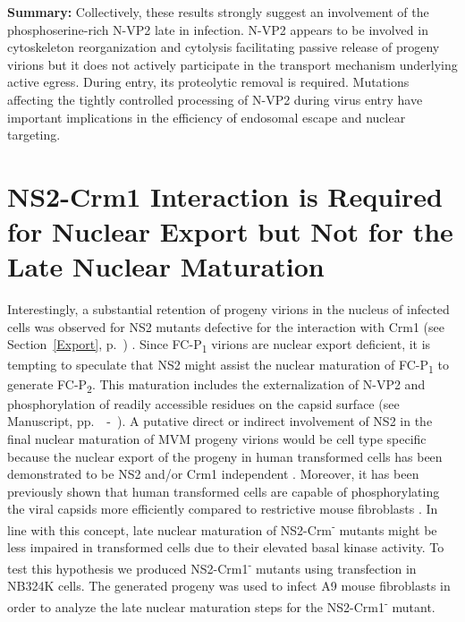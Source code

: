 \medskip
\textbf{Summary:} Collectively, these results strongly suggest an involvement of the phosphoserine-rich N-VP2 late in infection. N-VP2 appears to be involved in cytoskeleton reorganization and cytolysis facilitating passive release of progeny virions but it does not actively participate in the transport mechanism underlying active egress. During entry, its proteolytic removal is required. Mutations affecting the tightly controlled processing of N-VP2 during virus entry have important implications in the efficiency of endosomal escape and nuclear targeting.         


\clearpage
\section{NS2-Crm1 Interaction is Required for Nuclear Export but Not for the Late Nuclear Maturation}

Interestingly, a substantial retention of progeny virions in the nucleus of infected cells was observed for NS2 mutants defective for the interaction with Crm1 (see Section~\ref{Export}, p.~\pageref{Export}) \cite{pmid12239307, pmid11884550}. Since FC-P\textsubscript{1} virions are nuclear export deficient, it is tempting to speculate that NS2 might assist the nuclear maturation of FC-P\textsubscript{1} to generate FC-P\textsubscript{2}. This maturation includes the externalization of N-VP2 and phosphorylation of readily accessible residues on the capsid surface (see Manuscript, pp.~\pageref{ChapterPub1}~-~\pageref{ChapterPub1End}). A putative direct or indirect involvement of NS2 in the final nuclear maturation of MVM progeny virions would be cell type specific because the nuclear export of the progeny in human transformed cells has been demonstrated to be NS2 and/or Crm1 independent \cite{pmid2147041, pmid15367635}. Moreover, it has been previously shown that human transformed cells are capable of phosphorylating the viral capsids more efficiently compared to restrictive mouse fibroblasts \cite{pmid11069983}. In line with this concept, late nuclear maturation of NS2-Crm\textsuperscript{-} mutants might be less impaired in transformed cells due to their elevated basal kinase activity. To test this hypothesis we produced NS2-Crm1\textsuperscript{-} mutants using transfection in NB324K cells. The generated progeny was used to infect A9 mouse fibroblasts in order to analyze the late nuclear maturation steps for the NS2-Crm1\textsuperscript{-} mutant.       

